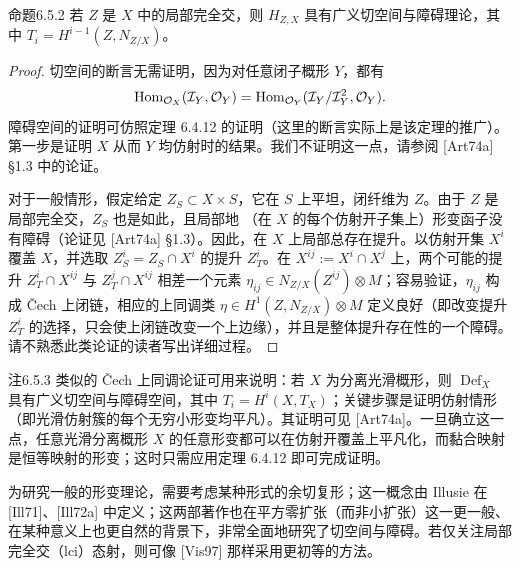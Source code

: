 \begin{origstatement}{命题}{6.5.2}\label{ch06:6.5.2}
若 $Z$ 是 $X$ 中的局部完全交，则 $H_{Z,X}$ 具有广义切空间与障碍理论，其中 $T_i=H^{i-1}(Z,N_{Z/X})$。
\end{origstatement}
\begin{proof}
切空间的断言无需证明，因为对任意闭子概形 $Y$，都有
\[
\operatorname{Hom}_{\mathcal O_X}(\mathcal I_Y,\mathcal O_Y)
=\operatorname{Hom}_{\mathcal O_Y}(\mathcal I_Y/\mathcal I_Y^2,\mathcal O_Y).
\]
障碍空间的证明可仿照定理 6.4.12 的证明（这里的断言实际上是该定理的推广）。第一步是证明 $X$ 从而 $Y$ 均仿射时的结果。我们不证明这一点，请参阅 [Art74a] §1.3 中的论证。

对于一般情形，假定给定 $Z_S\subset X\times S$，它在 $S$ 上平坦，闭纤维为 $Z$。由于 $Z$ 是局部完全交，$Z_S$ 也是如此，且局部地
（在 $X$ 的每个仿射开子集上）形变函子没有障碍（论证见 [Art74a] §1.3）。因此，在 $X$ 上局部总存在提升。以仿射开集 $X^i$ 覆盖 $X$，并选取 $Z_S^i=Z_S\cap X^i$ 的提升 $Z_T^i$。在 $X^{ij}:=X^i\cap X^j$ 上，两个可能的提升 $Z_T^i\cap X^{ij}$ 与 $Z_T^j\cap X^{ij}$ 相差一个元素 $\eta_{ij}\in N_{Z/X}(Z^{ij})\otimes M$；容易验证，$\eta_{ij}$ 构成 Čech 上闭链，相应的上同调类 $\eta\in H^1(Z,N_{Z/X})\otimes M$ 定义良好（即改变提升 $Z_T^i$ 的选择，只会使上闭链改变一个上边缘），并且是整体提升存在性的一个障碍。请不熟悉此类论证的读者写出详细过程。
\end{proof}
\begin{origstatement}{注}{6.5.3}\label{ch06:6.5.3}
类似的 Čech 上同调论证可用来说明：若 $X$ 为分离光滑概形，则 $\operatorname{Def}_X$ 具有广义切空间与障碍空间，其中 $T_i=H^i(X,T_X)$；关键步骤是证明仿射情形（即光滑仿射簇的每个无穷小形变均平凡）。其证明可见 [Art74a]。一旦确立这一点，任意光滑分离概形 $X$ 的任意形变都可以在仿射开覆盖上平凡化，而黏合映射是恒等映射的形变；这时只需应用定理 6.4.12 即可完成证明。
\end{origstatement}
为研究一般的形变理论，需要考虑某种形式的余切复形；这一概念由 Illusie 在 [Ill71]、[Ill72a] 中定义；这两部著作也在平方零扩张（而非小扩张）这一更一般、在某种意义上也更自然的背景下，非常全面地研究了切空间与障碍。若仅关注局部完全交（lci）态射，则可像 [Vis97] 那样采用更初等的方法。
